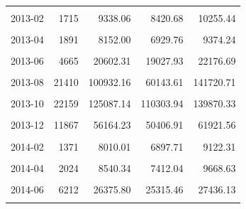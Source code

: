 \begin{longtable}[t]{crrrr}
\cellcolor{gray!10}{2013-01} & \cellcolor{gray!10}{2544} & \cellcolor{gray!10}{13976.25} & \cellcolor{gray!10}{11200.11} & \cellcolor{gray!10}{16752.39}\\
2013-02 & 1715 & 9338.06 & 8420.68 & 10255.44\\
\cellcolor{gray!10}{2013-03} & \cellcolor{gray!10}{2283} & \cellcolor{gray!10}{9737.17} & \cellcolor{gray!10}{8484.59} & \cellcolor{gray!10}{10989.76}\\
2013-04 & 1891 & 8152.00 & 6929.76 & 9374.24\\
\cellcolor{gray!10}{2013-05} & \cellcolor{gray!10}{2844} & \cellcolor{gray!10}{12273.51} & \cellcolor{gray!10}{10909.03} & \cellcolor{gray!10}{13638.00}\\
2013-06 & 4665 & 20602.31 & 19027.93 & 22176.69\\
\cellcolor{gray!10}{2013-07} & \cellcolor{gray!10}{8794} & \cellcolor{gray!10}{47147.32} & \cellcolor{gray!10}{32106.73} & \cellcolor{gray!10}{62187.92}\\
2013-08 & 21410 & 100932.16 & 60143.61 & 141720.71\\
\cellcolor{gray!10}{2013-09} & \cellcolor{gray!10}{36019} & \cellcolor{gray!10}{193925.02} & \cellcolor{gray!10}{173695.85} & \cellcolor{gray!10}{214154.19}\\
2013-10 & 22159 & 125087.14 & 110303.94 & 139870.33\\
\cellcolor{gray!10}{2013-11} & \cellcolor{gray!10}{11954} & \cellcolor{gray!10}{59065.28} & \cellcolor{gray!10}{42758.58} & \cellcolor{gray!10}{75371.99}\\
2013-12 & 11867 & 56164.23 & 50406.91 & 61921.56\\
\cellcolor{gray!10}{2014-01} & \cellcolor{gray!10}{3044} & \cellcolor{gray!10}{16321.43} & \cellcolor{gray!10}{13995.41} & \cellcolor{gray!10}{18647.45}\\
2014-02 & 1371 & 8010.01 & 6897.71 & 9122.31\\
\cellcolor{gray!10}{2014-03} & \cellcolor{gray!10}{1929} & \cellcolor{gray!10}{8550.12} & \cellcolor{gray!10}{7111.53} & \cellcolor{gray!10}{9988.72}\\
2014-04 & 2024 & 8540.34 & 7412.04 & 9668.63\\
\cellcolor{gray!10}{2014-05} & \cellcolor{gray!10}{2931} & \cellcolor{gray!10}{12567.05} & \cellcolor{gray!10}{11244.63} & \cellcolor{gray!10}{13889.47}\\
2014-06 & 6212 & 26375.80 & 25315.46 & 27436.13\\
\cellcolor{gray!10}{2014-07} & \cellcolor{gray!10}{10529} & \cellcolor{gray!10}{50293.29} & \cellcolor{gray!10}{38237.22} & \cellcolor{gray!10}{62349.36}\\

\end{longtable}
